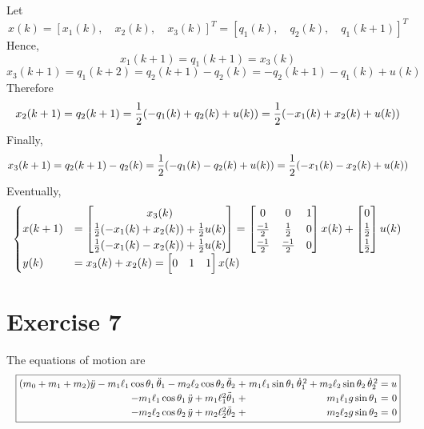 \documentclass[12pt,a4paper]{article}
\begin{document}
Let
\[
x(k) = [x_1(k), \quad x_2(k), \quad x_3(k)]^T  = [q_1(k), \quad q_2(k),\quad q_1(k + 1)]^T
\]
Hence,
\[
x_1(k + 1) = q_1(k + 1) = x_3(k)
\]
\[
x_3(k + 1) = q_1(k + 2) = q_2(k + 1) - q_2(k) = - q_2(k + 1) - q_1(k) + u(k)
\]
Therefore
\[
	x_2(k + 1) = q_2(k + 1) = {1\over2} (-q_1(k) + q_2(k) + u(k)) = {1\over2} (-x_1(k) + x_2(k) + u(k))
\]
Finally, 
\[
	x_3(k + 1) = q_2(k + 1) - q_2(k) = {1\over2}(-q_1(k) - q_2(k) + u(k)) = {1\over2} (-x_1(k) - x_2(k) + u(k))
\]
Eventually, 
\[
\begin{cases}
x(k + 1) &= \begin{bmatrix}
	x_3(k) \\ {1\over2} (-x_1(k) + x_2(k) ) + {1\over2} u(k) \\ {1\over2} (-x_1(k) - x_2(k) ) + {1\over2} u(k)
\end{bmatrix} = \begin{bmatrix}
0 & 0 & 1 \\
{-1\over2} & {1\over2} & 0 \\
{-1\over2} & {-1\over2} & 0
\end{bmatrix}x(k) + \begin{bmatrix}
0 \\ {1\over2} \\ {1\over2}
\end{bmatrix} u(k) \\
y(k) &= x_3(k) + x_2(k) = \begin{bmatrix}
	0 & 1 & 1
\end{bmatrix} x(k)
\end{cases}
\]


\clearpage
\section*{Exercise 7}
\noindent The equations of motion are
\[
\resizebox{\linewidth}{!}{$\displaystyle
\boxed{
\begin{array}{@{}r@{\;}c@{\;}r@{\;}c@{\;}r@{}}
 (m_0+m_1+m_2)\ddot y
 -m_1\ell_1\cos\theta_1\,\ddot\theta_1
 -m_2\ell_2\cos\theta_2\,\ddot\theta_2
 &+&m_1\ell_1\sin\theta_1\,\dot\theta_1^{\,2}
 +m_2\ell_2\sin\theta_2\,\dot\theta_2^{\,2}&=&u\\[2pt]
 -m_1\ell_1\cos\theta_1\,\ddot y
 +m_1\ell_1^2\ddot\theta_1
 &+&m_1\ell_1g\sin\theta_1&=&0\\[2pt]
 -m_2\ell_2\cos\theta_2\,\ddot y
 +m_2\ell_2^2\ddot\theta_2
 &+&m_2\ell_2g\sin\theta_2&=&0
\end{array}
}
$}
\]
\end{document}

